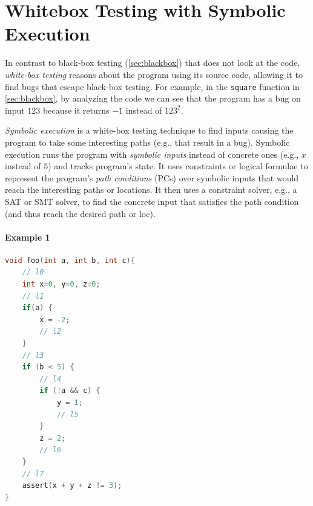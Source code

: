\documentclass[oneside,11pt,dvipsnames]{book}
\newcommand{\code}[1]{\texttt{#1}}
\begin{document}



\section{Whitebox Testing with Symbolic Execution}\label{sec:symbolic-execution}

In contrast to black-box testing (\autoref{sec:blackbox}) that does not look at the code, \emph{white-box testing} reasons about the program using its source code, allowing it to find bugs that escape black-box testing.  For example, in the \code{square} function in \autoref{sec:blackbox}, by analyzing the code we can see that the program has a bug on input $123$ because it returns $-1$ instead of ${123}^2$. 


\emph{Symbolic execution} is a white-box testing technique to find inputs causing the program to take some interesting paths (e.g., that result in a bug). Symbolic execution runs the program with \emph{symbolic inputs} instead of concrete ones (e.g., $x$ instead of $5$) and tracks program's state. It uses constraints or logical formulae to represent the program's \emph{path conditions} (PCs) over symbolic inputs that would reach the interesting paths or locations. It then uses a constraint solver, e.g., a SAT or SMT solver, to find the concrete input that satisfies the path condition (and thus reach the desired path or loc). 
\paragraph{Example 1}
\begin{lstlisting}[language=c]
void foo(int a, int b, int c){    
    // l0
    int x=0, y=0, z=0;
    // l1
    if(a) {        
        x = -2;
        // l2
    }
    // l3
    if (b < 5) {
        // l4 
        if (!a && c) {            
            y = 1; 
            // l5
        }        
        z = 2;
        // l6 
    }
    // l7
    assert(x + y + z != 3);
}
\end{lstlisting}
\end{document}
